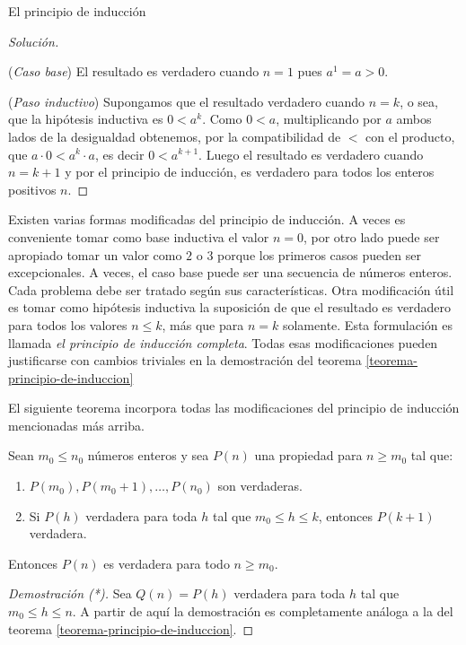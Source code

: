 \begin{section}{El principio de inducción}
\begin{ejemplo*}
\begin{proof}[Solución]
    \
    
    \noindent (\textit{Caso  base}) El resultado es verdadero
    cuando $n=1$ pues $ a^1 = a > 0$.
    
    \noindent (\textit{Paso  inductivo})
    Supongamos que el resultado verdadero cuando $n=k$, o sea, que la hipótesis inductiva es $0 < a^k$. Como $0<a$, multiplicando por $a$ ambos lados de la desigualdad obtenemos, por la compatibilidad de $<$ con el producto, que $a\cdot 0 < a^k \cdot a$, es decir $0<a^{k+1}$.  Luego el resultado es verdadero cuando $n=k+1$ y por el principio de inducción, es verdadero para todos los enteros positivos $n$.
\end{proof}
\end{ejemplo*}

Existen varias formas modificadas del principio de inducción. A veces es conveniente tomar como base inductiva el valor $n=0$, por otro lado puede ser apropiado tomar un valor como $2$ o $3$ porque los primeros casos pueden ser excepcionales. A veces, el caso base puede  ser una secuencia de números enteros. Cada problema debe ser tratado según sus características. Otra modificación útil es tomar como hipótesis inductiva la suposición de que el resultado es verdadero para todos los valores $n\le k$, más que para $n=k$ solamente. Esta formulación es llamada \textit{el principio de inducción completa}. Todas esas modificaciones pueden justificarse con cambios triviales en la demostración del teorema \ref{teorema-principio-de-induccion}

El siguiente teorema incorpora todas las modificaciones del principio de inducción mencionadas más arriba.

\begin{teorema} \label{ind-completa} Sean $m_0 \le n_0$ números enteros y sea $P(n)$ una propiedad para $n \ge m_0$ tal que:
    \begin{enumerate}[label=\textit{\alph*)}]
    \item\label{it.indcompleta_1} $P(m_0), P(m_0 +1), \ldots, P(n_0)$ son verdaderas.
    \item\label{it.indcompleta_n} Si  $P(h)$ verdadera para toda $h$ tal que $m_0 \le h \le k$, entonces $P(k + 1)$ verdadera.
    \end{enumerate}
    Entonces $P(n)$ es verdadera para todo $n \ge m_0$.
    \end{teorema}
    \begin{proof}[Demostración (*)]
        Sea $Q(n) = P(h)$ verdadera para toda $h$ tal que $m_0 \le h \le n$. A partir de aquí la demostración es completamente análoga   a  la del teorema \ref{teorema-principio-de-induccion}. 
        

\end{proof}
\end{section}
